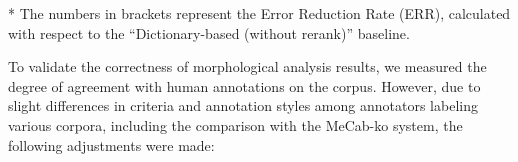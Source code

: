 \documentclass[AMS,STIX2COL]{WileyNJD-v2}
\begin{document}
\begin{table}[ht]
\begin{tabular*}{500pt}{@{\extracolsep\fill}c|cccccc@{\extracolsep\fill}}
            \bottomrule
        \end{tabular*}
        \begin{tablenotes}
            \footnotesize
            \item\hspace{2mm} * The numbers in brackets represent the Error Reduction Rate (ERR), calculated with respect to the ``Dictionary-based (without rerank)'' baseline.
        \end{tablenotes}
    \end{table}

    To validate the correctness of morphological analysis results, we measured the degree of agreement with human annotations on the corpus.
    However, due to slight differences in criteria and annotation styles among annotators labeling various corpora, including the comparison with the MeCab-ko system, the following adjustments were made:
\end{document}
